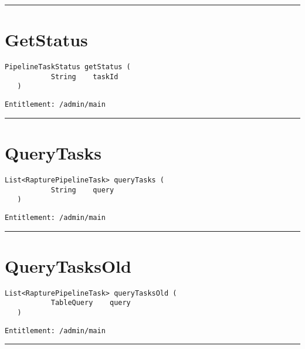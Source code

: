 \rule{12cm}{2pt}
\section{GetStatus}
\label{Api:GetStatus}
\begin{lstlisting}[style=nonumbers]
   PipelineTaskStatus getStatus (
           String    taskId
   )
\end{lstlisting}
\begin{Verbatim}[formatcom=\color{Maroon}]
  Entitlement: /admin/main
\end{Verbatim}



\rule{12cm}{2pt}
\section{QueryTasks}
\label{Api:QueryTasks}
\begin{lstlisting}[style=nonumbers]
   List<RapturePipelineTask> queryTasks (
           String    query
   )
\end{lstlisting}
\begin{Verbatim}[formatcom=\color{Maroon}]
  Entitlement: /admin/main
\end{Verbatim}



\rule{12cm}{2pt}
\section{QueryTasksOld}
\label{Api:QueryTasksOld}
\begin{lstlisting}[style=nonumbers]
   List<RapturePipelineTask> queryTasksOld (
           TableQuery    query
   )
\end{lstlisting}
\begin{Verbatim}[formatcom=\color{Maroon}]
  Entitlement: /admin/main
\end{Verbatim}



\rule{12cm}{2pt}
